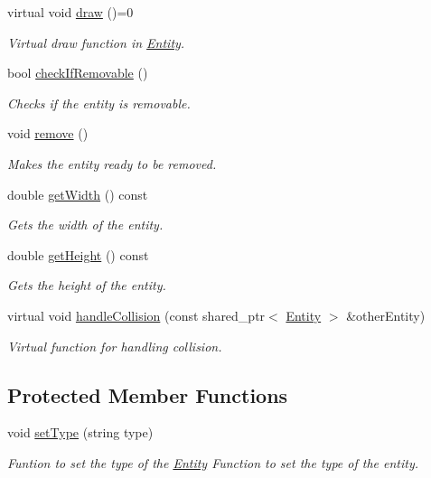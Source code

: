 \begin{DoxyCompactItemize}
virtual void \hyperlink{classGameLogic_1_1Entity_adf23a7036cb99dfc6e33434018131da4}{draw} ()=0
\begin{DoxyCompactList}\small\item\em Virtual draw function in \hyperlink{classGameLogic_1_1Entity}{Entity}. \end{DoxyCompactList}\item 
bool \hyperlink{classGameLogic_1_1Entity_ac1521f845aac18a02bc8a2434579919e}{check\+If\+Removable} ()
\begin{DoxyCompactList}\small\item\em Checks if the entity is removable. \end{DoxyCompactList}\item 
void \hyperlink{classGameLogic_1_1Entity_a5bfae36adfedd3652d8dd8a807184c5f}{remove} ()
\begin{DoxyCompactList}\small\item\em Makes the entity ready to be removed. \end{DoxyCompactList}\item 
double \hyperlink{classGameLogic_1_1Entity_a9a7be1c6095ef036eb91b962cd289dc3}{get\+Width} () const
\begin{DoxyCompactList}\small\item\em Gets the width of the entity. \end{DoxyCompactList}\item 
double \hyperlink{classGameLogic_1_1Entity_a8d66c2c0153168c3ad9d345327f2c866}{get\+Height} () const
\begin{DoxyCompactList}\small\item\em Gets the height of the entity. \end{DoxyCompactList}\item 
virtual void \hyperlink{classGameLogic_1_1Entity_af3461a4c6321b1af250821d7a1329ba7}{handle\+Collision} (const shared\+\_\+ptr$<$ \hyperlink{classGameLogic_1_1Entity}{Entity} $>$ \&other\+Entity)
\begin{DoxyCompactList}\small\item\em Virtual function for handling collision. \end{DoxyCompactList}\end{DoxyCompactItemize}
\subsection*{Protected Member Functions}
\begin{DoxyCompactItemize}
\item 
void \hyperlink{classGameLogic_1_1Entity_a5333b148dd17e31aafd6e115e0b3b43d}{set\+Type} (string type)
\begin{DoxyCompactList}\small\item\em Funtion to set the type of the \hyperlink{classGameLogic_1_1Entity}{Entity} Function to set the type of the entity. \end{DoxyCompactList}\end{DoxyCompactItemize}


